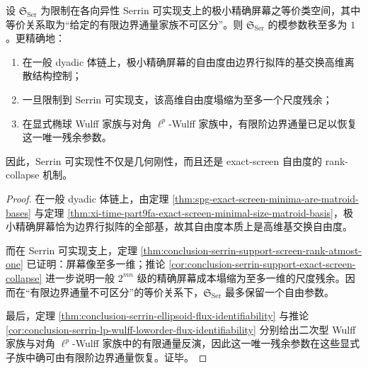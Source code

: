 \begin{theorem}\label{thm:conclusion-screen-serrin-support-moduli-rank-collapse}
设 \(\mathfrak S_{\mathrm{Ser}}\) 为限制在各向异性 Serrin 可实现支上的极小精确屏幕之等价类空间，其中等价关系取为“给定的有限边界通量家族不可区分”。则 \(\mathfrak S_{\mathrm{Ser}}\) 的模参数秩至多为 \(1\)。更精确地：
\begin{enumerate}
  \item 在一般 dyadic 体链上，极小精确屏幕的自由度由边界行拟阵的基交换高维离散结构控制；
  \item 一旦限制到 Serrin 可实现支，该高维自由度塌缩为至多一个尺度残余；
  \item 在显式椭球 Wulff 家族与对角 \(\ell^p\)-Wulff 家族中，有限阶边界通量已足以恢复这一唯一残余参数。
\end{enumerate}
因此，Serrin 可实现性不仅是几何刚性，而且还是 exact-screen 自由度的 rank-collapse 机制。
\end{theorem}
\begin{proof}
在一般 dyadic 体链上，由定理 \ref{thm:spg-exact-screen-minima-are-matroid-bases} 与定理 \ref{thm:xi-time-part9fa-exact-screen-minimal-size-matroid-basis}，极小精确屏幕恰为边界行拟阵的全部基，故其自由度本质上是高维基交换自由度。

而在 Serrin 可实现支上，定理 \ref{thm:conclusion-serrin-support-screen-rank-atmost-one} 已证明：屏幕像至多一维；推论 \ref{cor:conclusion-serrin-support-exact-screen-collapse} 进一步说明一般 \(2^{mn}\) 级的精确屏幕成本塌缩为至多一维的尺度残余。因而在“有限边界通量不可区分”的等价关系下，\(\mathfrak S_{\mathrm{Ser}}\) 最多保留一个自由参数。

最后，定理 \ref{thm:conclusion-serrin-ellipsoid-flux-identifiability} 与推论 \ref{cor:conclusion-serrin-lp-wulff-loworder-flux-identifiability} 分别给出二次型 Wulff 家族与对角 \(\ell^p\)-Wulff 家族中的有限通量反演，因此这一唯一残余参数在这些显式子族中确可由有限阶边界通量恢复。证毕。
\end{proof}

